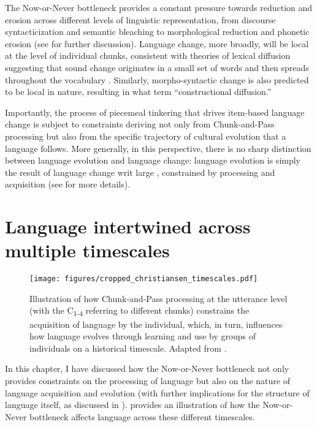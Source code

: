 \documentclass[output=paper]{langsci/langscibook}
\begin{document}
      The Now-or-Never bottleneck provides a constant pressure towards reduction and erosion across different levels of linguistic representation, from discourse syntacticization and semantic bleaching to morphological reduction and phonetic erosion (see \citealt{ChristiansenInPress} for further discussion). Language change, more broadly, will be local at the level of individual chunks, consistent with theories of lexical diffusion suggesting that sound change originates in a small set of words and then spreads throughout the vocabulary \citep[e.g.,][]{Wang1977}. Similarly, morpho-syntactic change is also predicted to be local in nature, resulting in what \citet{ChristiansenInPress} term “constructional diffusion.”   

  Importantly, the process of piecemeal tinkering that drives item-based language change is subject to constraints deriving not only from Chunk-and-Pass processing but also from the specific trajectory of cultural evolution that a language follows. More generally, in this perspective, there is no sharp distinction between language evolution and language change: language evolution is simply the result of language change writ large \citep[see also][]{Heine2007}, constrained by processing and acquisition (see \citealt{Christiansen2016} for more details).

\largerpage
\section{Language intertwined across multiple timescales}
\begin{figure}[b]  
\texttt{[image: figures/cropped\_christiansen\_timescales.pdf]}
\caption{Illustration of how Chunk-and-Pass processing at the utterance level (with the C\textsubscript{1-4} referring to different chunks) constrains the acquisition of language by the individual, which, in turn, influences how language evolves through learning and use by groups of individuals on a historical timescale. Adapted from \citet{Christiansen2016}.
}
\label{fig:christensen:1}
\end{figure}
  In this chapter, I have discussed how the Now-or-Never bottleneck not only provides constraints on the processing of language but also on the nature of language acquisition and evolution (with further implications for the structure of language itself, as discussed in \citealt{Christiansen2016,ChristiansenInPress}).  provides an illustration of how the Now-or-Never bottleneck affects language across these different timescales.
\end{document}
